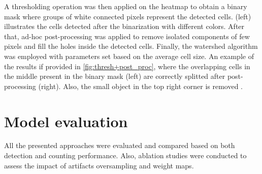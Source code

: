 A thresholding operation was then applied on the heatmap to obtain a binary mask where groups of white connected pixels represent the detected cells.  (left) illustrates the cells detected after the binarization with different colors.
After that, ad-hoc post-processing was applied to remove isolated components of few pixels and fill the holes inside the detected cells. 
Finally, the watershed algorithm \cite{watershed} was employed with parameters set based on the average cell size.
An example of the results if provided in \cref{fig:thresh+post_proc}, where the overlapping cells in the middle present in the binary mask (left) are correctly splitted after post-processing (right). Also, the small object in the top right corner is removed
.


\section{Model evaluation} \label{sec:model_evaluation}

All the presented approaches were evaluated and compared based on both detection and counting performance. 
Also, ablation studies were conducted to assess the impact of artifacts oversampling and weight maps.

